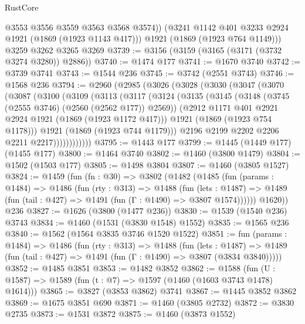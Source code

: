 \begin{lexlean}{RustCore}
\begin{coremodule}
          @3553
          @3556
          @3559
          @3563
          @3568
          @3574))
      (@3241 @1142 @401 @3233 @2924 @1921 (@1869 (@1923 @1143 @417)))
      @1921
      (@1869 (@1923 @764 @1149)))
    @3259
    @3262
    @3265
    @3269
@3739 := @3156 (@3159 (@3165 (@3171 (@3732 @3274 @3280)) @2886))
@3740 := @1474 @177
@3741 := @1670 @3740
@3742 := @3739 @3741
@3743 := @1544 @236
@3745 := @3742 (@2551 @3743)
@3746 := @1568 @236
@3794 := @2960
    (@2985
      (@3026
        (@3028
          (@3030
            (@3047
              (@3070
                (@3087
                  (@3100
                    (@3109
                      (@3113
                        (@3117
                          (@3124
                            (@3135
                              (@3145
                                (@3148 (@3745 (@2555 @3746) (@2560 (@2562 @177)) @2569))
                                (@2912 @1171 @401 @2921 @2924 @1921 (@1869 (@1923 @1172 @417)))
                                @1921
                                (@1869 (@1923 @754 @1178)))
                              @1921
                              (@1869 (@1923 @744 @1179)))
                            @2196
                            @2199
                            @2202
                            @2206
                            @2211
                            @2217))))))))))))
@3795 := @1443 @177
@3799 := @1445 (@1449 @177) (@1455 @177)
@3800 := @1464 @3740
@3802 := @1460 (@3800 @1479)
@3804 := @1502 (@1503 @177)
@3805 := @1498 @3804
@3807 := @1460 (@3805 @1527)
@3824 := @1459
    (fun (fn : @30) =>
    @3802
      (@1482
        (@1485
          (fun (params : @1484) =>
          @1486
            (fun (rty : @313) =>
            @1488
              (fun (lets : @1487) =>
              @1489 (fun (tail : @427) => @1491 (fun (Γ : @1490) => @3807 @1574))))))
        @1620))
    @236
@3827 := @1626 (@3800 (@1477 @236))
@3830 := @1539 (@1540 @236) @3743
@3834 := @1460 (@1531 (@3830 @1548) @1552)
@3835 := @1565 @236
@3840 := @1562 (@1564 @3835 @3746 @1520 @1522)
@3851 := fun (params : @1484) =>
  @1486
    (fun (rty : @313) =>
    @1488
      (fun (lets : @1487) =>
      @1489 (fun (tail : @427) => @1491 (fun (Γ : @1490) => @3807 (@3834 @3840)))))
@3852 := @1485 @3851
@3853 := @1482 @3852
@3862 := @1588 (fun (U : @1587) => @1589 (fun (t : @7) => @1597 (@1460 (@1603 @3743 @1478) @1614)))
@3865 := @3827 (@3853 @3862) @3741
@3867 := @1445 @3852 @3862
@3869 := @1675 @3851 @690
@3871 := @1460 (@3805 @2732)
@3872 := @3830 @2735
@3873 := @1531 @3872
@3875 := @1460 (@3873 @1552)

\end{coremodule}
\end{lexlean}

